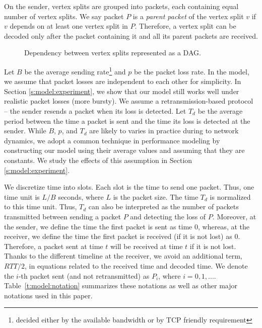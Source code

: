     On the sender, vertex splits are grouped into packets,
    each containing equal number of vertex splits.  We say packet $P$ is a \textit{parent packet}
    of the vertex split $v$ if %
    $v$ 
    depends on at least one vertex split in $P$.  Therefore, a vertex split
    can be decoded only after the packet containing it and all its
    parent packets are received.

\begin{figure}
\centering
{}
\caption{Dependency between vertex splits represented as a DAG.\label{model:dag2}}
\end{figure}
\fi

    Let $B$ be the average
    sending rate\footnote{decided either by the available bandwidth or by TCP friendly requirement} and $p$ be the packet loss rate.
    In the model, we assume that packet losses are independent to each other for simplicity.
    In Section \ref{s:model:experiment}, we %
    show that our model still works well under realistic packet losses (more bursty).
    We assume a retransmission-based protocol -- the sender resends a packet when its loss is detected.
    Let $T_d$ be the
    average period between the time a packet %
    is sent and the
    time %
    its loss is detected at the sender.
    While $B$, $p$, and $T_d$ are likely to varies in practice during to network dynamics, 
    we adopt a common technique in performance modeling by constructing our model using 
    their average values and assuming that they are constants.
    We study the effects of this assumption in Section \ref{s:model:experiment}.

    We discretize time into slots.  Each slot is the time to
    send one packet.  Thus, one time unit is $L/B$ seconds, where $L$ is the
    packet size.  
    The time $T_d$ is normalized to this
    time unit.  Thus, $T_d$ can also be interpreted as the number
    of packets transmitted between sending a packet $P$ and detecting
    the loss of $P$.  Moreover, at the sender,
    we define the time the first packet is sent as time $0$, whereas, at
    the receiver, we define the time the first packet is received (if it
    is not lost) as $0$.  Therefore, a packet sent at time $t$ will be 
    received at time $t$ if it is not lost.  Thanks to the different 
    timeline at the
    receiver, we avoid an additional term, $RTT/2$, in
    equations related to the received time and decoded time. 
    We denote the $i$-th packet sent (and not retransmitted) as $P_i$, where $i = 0, 1, ...$.
    Table~\ref{t:model:notation} summarizes these notations as well as
    other major notations used in this paper.

